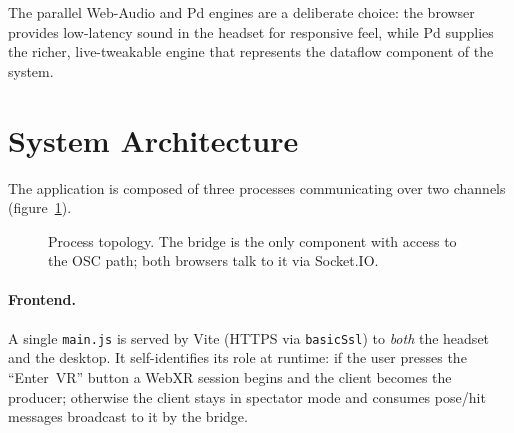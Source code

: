 \documentclass[11pt,a4paper]{article}
\begin{document}
The parallel Web-Audio and Pd engines are a deliberate choice: the
browser provides low-latency sound in the headset for responsive
feel, while Pd supplies the richer, live-tweakable engine that
represents the dataflow component of the system.

\section{System Architecture}

The application is composed of three processes communicating over two
channels (figure~\ref{fig:arch}).

\begin{figure}[h]
\centering
{}
\caption{Process topology. The bridge is the only component with
access to the OSC path; both browsers talk to it via Socket.IO.}
\label{fig:arch}
\end{figure}

\paragraph{Frontend.} A single \texttt{main.js} is served by Vite
(HTTPS via \texttt{basicSsl}) to \emph{both} the headset and the
desktop. It self-identifies its role at runtime: if the user presses
the ``Enter~VR'' button a WebXR session begins and the client becomes
the producer; otherwise the client stays in spectator mode and
consumes pose/hit messages broadcast to it by the bridge.
\end{document}

